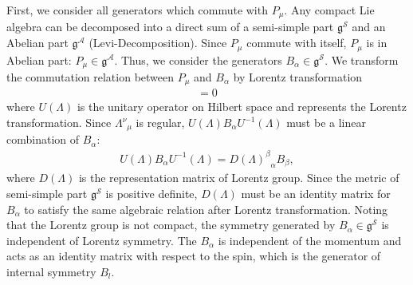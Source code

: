 \documentclass[a4paper,12pt]{article}
\theoremstyle{plain}
\theoremstyle{definition}
\begin{document}
First, we consider all generators which commute with $P_{\mu}$.
Any compact Lie algebra can be decomposed into a direct sum of a semi-simple part $\mathfrak{g}^\mathcal{S}$ and an Abelian part $\mathfrak{g}^\mathcal{A}$ (Levi-Decomposition). 
Since $P_\mu$ commute with itself, $P_{\mu}$ is in Abelian part: $P_{\mu} \in \mathfrak{g}^\mathcal{A}$. 
Thus, we consider the generators $B_{\alpha} \in \mathfrak{g}^\mathcal{S} $. 
We transform the commutation relation between $P_{\mu}$ and $B_\alpha$ by Lorentz transformation
\begin{align}
[U(\Lambda) B_\alpha U^{-1}(\Lambda),{\Lambda^\nu}_\mu P_\nu]=0
\end{align}
where $U(\Lambda)$ is the unitary operator on Hilbert space and represents the Lorentz transformation.
Since $ {\Lambda^\nu}_\mu $ is regular, $U(\Lambda) B_\alpha U^{-1}(\Lambda)$ must be a linear combination of $B_\alpha$:
\begin{align}
U(\Lambda) B_\alpha U^{-1}(\Lambda) = {D(\Lambda)^\beta}_\alpha B_\beta,
\end{align}
where $D(\Lambda)$ is the representation matrix of Lorentz group.
Since the metric of semi-simple part $\mathfrak{g}^\mathcal{S}$ is positive definite, $D(\Lambda)$ must be an identity matrix for $B_\alpha$ to satisfy the same algebraic relation after Lorentz transformation.
Noting that the Lorentz group is not compact, the symmetry generated by $B_\alpha \in \mathfrak{g}^\mathcal{S} $ is independent of Lorentz symmetry.
The $B_\alpha$ is independent of the momentum and acts as an identity matrix with respect to the spin, which is the generator of internal symmetry $B_l$.
\end{document}
